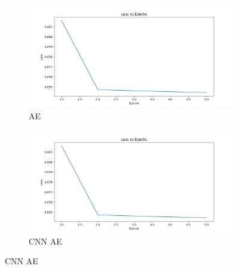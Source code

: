 \begin{figure}
  \begin{subfigure}[t]{.5\textwidth}
    \centering
    \includegraphics[width=\linewidth]{figures/loss.png}
    \caption{AE}
  \end{subfigure}
  \hfill
  \begin{subfigure}[t]{.5\textwidth}
    \centering
    \includegraphics[width=\linewidth]{figures/loss.png}
    \caption{CNN AE}
  \end{subfigure}

  \medskip


\end{figure}
